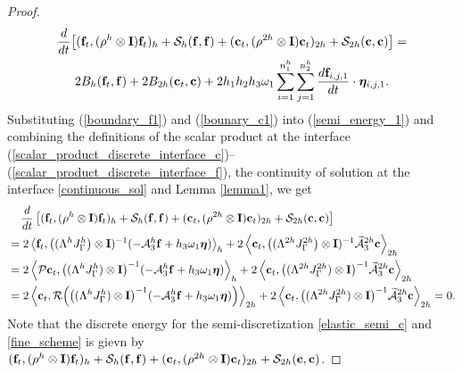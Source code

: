 \begin{proof}
	\begin{multline}\label{semi_energy_1}
	\frac{d}{dt}\big[({\bf f}_t,(\rho^h\otimes {\bf I}) {\bf f}_t)_h + \mathcal{S}_{h}({\bf f},{\bf f}) + ({\bf c}_t,(\rho^{2h}\otimes {\bf I}) {\bf c}_t)_{2h} + \mathcal{S}_{2h}({\bf c},{\bf c}) \big]  = \\
	2B_{h}({\bf f}_t,{\bf f}) + 2B_{2h}({\bf c}_t,{\bf c}) + 2h_1h_2h_3\omega_1\sum_{i = 1}^{n_1^h}\sum_{j=1}^{n_2^h}\frac{d{\bf f}_{i,j,1}}{dt}\cdot{\bm \eta}_{i,j,1}.
	\end{multline}
	Substituting (\ref{boundary_f1}) and (\ref{bounary_c1}) into (\ref{semi_energy_1}) and combining the definitions of the scalar product at the interface (\ref{scalar_product_discrete_interface_c})--(\ref{scalar_product_discrete_interface_f}), the continuity of solution at the interface \eqref{continuous_sol} and Lemma \ref{lemma1}, we get
	\begin{align*}\label{semi_energy_2}
	&\hspace{0.4cm}\frac{d}{dt}\left[({\bf f}_t,(\rho^h\otimes {\bf I}) {\bf f}_t)_{h} + \mathcal{S}_{h}({\bf f},{\bf f}) + ({\bf c}_t,(\rho^{2h}\otimes {\bf I}) {\bf c}_t)_{2h} + \mathcal{S}_{2h}({\bf c},{\bf c}) \right]   \nonumber\\
	& = 2\left<{\bf f}_t,\big(({\Lambda}^{h}{J}^h_\Gamma\big)\otimes {\bf I})^{-1}(-\mathcal{A}_3^h{\bf f}+h_3\omega_1{\bm \eta})\right>_{h}+ 2\left<{\bf c}_t,\big(({\Lambda}^{2h}{J}^{2h}_\Gamma\big)\otimes{\bf I})^{-1}\wt{\mathcal{A}}_3^{2h}{\bf c}\right>_{2h} \nonumber\\
	& = 2\left<{\mathcal{P}}{\bf c}_t,\big(({\Lambda}^{h}{J}^h_\Gamma)\otimes{\bf I}\big)^{-1}(-\mathcal{A}_3^h{\bf f}+h_3\omega_1{\bm \eta})\right>_{h}+ 2\left<{\bf c}_t, \big(({\Lambda}^{2h}{J}^{2h}_\Gamma)\otimes{\bf I}\big)^{-1}\wt{\mathcal{A}}_3^{2h}{\bf c}\right>_{2h} \nonumber\\
	& = 2\left<{\bf c}_t,{\mathcal{R}}\Big(\big(({\Lambda}^{h}{J}^h_\Gamma)\otimes{\bf I}\big)^{-1}(-\mathcal{A}_3^h{\bf f}+h_3\omega_1{\bm \eta})\Big)\right>_{2h}+ 2\left<{\bf c}_t,\big(({\Lambda}^{2h}{J}^{2h}_\Gamma)\otimes{\bf I}\big)^{-1}\wt{\mathcal{A}}_3^{2h}{\bf c}\right>_{2h} = 0.
	\end{align*}
Note that the discrete energy for the semi-discretization \eqref{elastic_semi_c} and \eqref{fine_scheme} is gievn by $({\bf f}_t,(\rho^h\otimes {\bf I}) {\bf f}_t)_{h} + \mathcal{S}_{h}({\bf f},{\bf f}) + ({\bf c}_t,(\rho^{2h} \otimes {\bf I}){\bf c}_t)_{2h} + \mathcal{S}_{2h}({\bf c},{\bf c})$.
\end{proof}








 